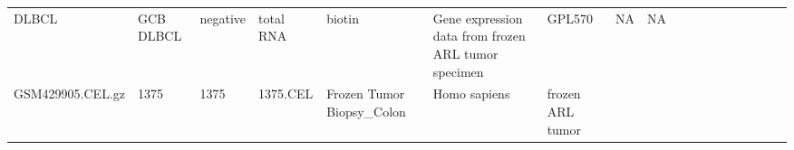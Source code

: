 \documentclass[]{article}
\begin{document}
\begin{longtable}[]{@{}lllllllrllllllllll@{}}
\begin{minipage}[t]{0.06\columnwidth}
DLBCL\strut
\end{minipage} & \begin{minipage}[t]{0.06\columnwidth}\raggedright
GCB DLBCL\strut
\end{minipage} & \begin{minipage}[t]{0.04\columnwidth}\raggedright
negative\strut
\end{minipage} & \begin{minipage}[t]{0.02\columnwidth}\raggedright
total RNA\strut
\end{minipage} & \begin{minipage}[t]{0.01\columnwidth}\raggedright
biotin\strut
\end{minipage} & \begin{minipage}[t]{0.08\columnwidth}\raggedright
Gene expression data from frozen ARL tumor specimen\strut
\end{minipage} & \begin{minipage}[t]{0.01\columnwidth}\raggedright
GPL570\strut
\end{minipage} & \begin{minipage}[t]{0.00\columnwidth}\raggedright
NA\strut
\end{minipage} & \begin{minipage}[t]{0.01\columnwidth}\raggedright
NA\strut
\end{minipage}\tabularnewline
\begin{minipage}[t]{0.03\columnwidth}\raggedright
GSM429905.CEL.gz\strut
\end{minipage} & \begin{minipage}[t]{0.02\columnwidth}\raggedright
1375\strut
\end{minipage} & \begin{minipage}[t]{0.01\columnwidth}\raggedright
1375\strut
\end{minipage} & \begin{minipage}[t]{0.02\columnwidth}\raggedright
1375.CEL\strut
\end{minipage} & \begin{minipage}[t]{0.06\columnwidth}\raggedright
Frozen Tumor Biopsy\_Colon\strut
\end{minipage} & \begin{minipage}[t]{0.02\columnwidth}\raggedright
Homo sapiens\strut
\end{minipage} & \begin{minipage}[t]{0.04\columnwidth}\raggedright
frozen ARL tumor\strut
\end{minipage} & \begin{minipage}[t]{0.05\columnwidth}\raggedleft

\end{minipage}
\end{longtable}
\end{document}
